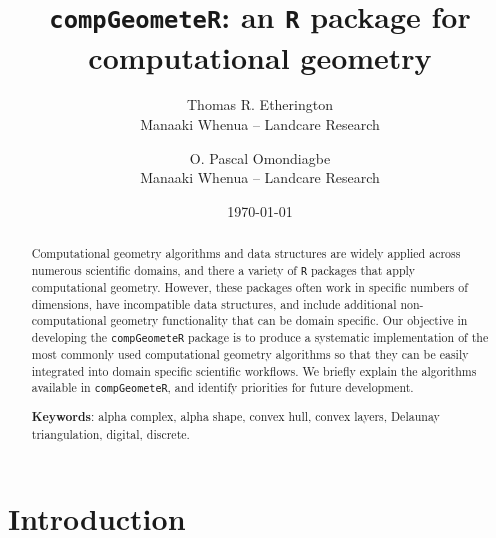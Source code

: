 \documentclass[12pt, a4paper]{article}
\begin{document}
\title{\texttt{compGeometeR}: an \texttt{R} package for computational geometry}

\author{Thomas R. Etherington  \\
	Manaaki Whenua -- Landcare Research  \\
	\and 
	O. Pascal Omondiagbe \\
	Manaaki Whenua -- Landcare Research \\
	}



\date{\today}



\maketitle


\begin{abstract}

Computational geometry algorithms and data structures are widely applied across numerous scientific domains, and there a variety of \texttt{R} packages that apply computational geometry.  However, these packages often work in specific numbers of dimensions, have incompatible data structures, and include additional non-computational geometry functionality that can be domain specific.  Our objective in developing the \texttt{compGeometeR} package is to produce a systematic implementation of the most commonly used computational geometry algorithms so that they can be easily integrated into domain specific scientific workflows.  We briefly explain the algorithms available in \texttt{compGeometeR}, and identify priorities for future development.

\begin{center}
\textbf{Keywords}: alpha complex, alpha shape, convex hull, convex layers, Delaunay triangulation, digital, discrete.
\end{center}

\end{abstract}

\section{Introduction}
\end{document}
